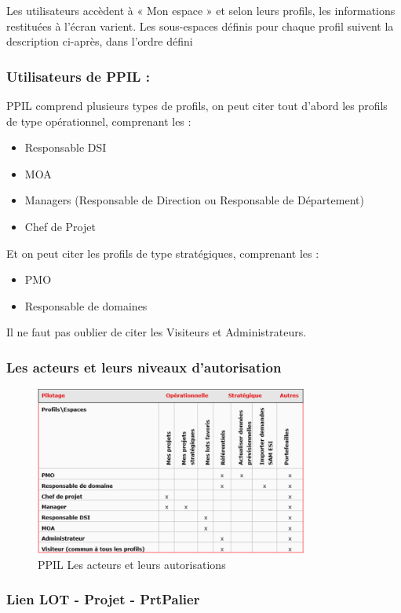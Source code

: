 Les utilisateurs accèdent à « Mon espace » et selon leurs profils, les informations restituées à l’écran varient. Les sous-espaces définis pour chaque profil suivent la description ci-après, dans l’ordre défini 

\subsubsection{Utilisateurs de PPIL :}
PPIL comprend plusieurs types de profils, on peut citer tout d'abord les profils de type opérationnel, comprenant les : 
\begin{itemize}
    \item Responsable DSI
    \item MOA
    \item Managers (Responsable de Direction ou Responsable de Département) 
    \item Chef de Projet
\end{itemize}
Et on peut citer les profils de type stratégiques, comprenant les :
\begin{itemize}
    \item PMO
    \item Responsable de domaines
\end{itemize}

Il ne faut pas oublier de citer les Visiteurs et Administrateurs.

\subsubsection{Les acteurs et leurs niveaux d'autorisation}
\begin{figure}[!h]
\centering
\includegraphics[width=0.8\textwidth]{images/ppil acteurs.png}
\caption{PPIL Les acteurs et leurs autorisations}
\end{figure}

\subsubsection{Lien LOT - Projet - PrtPalier}

